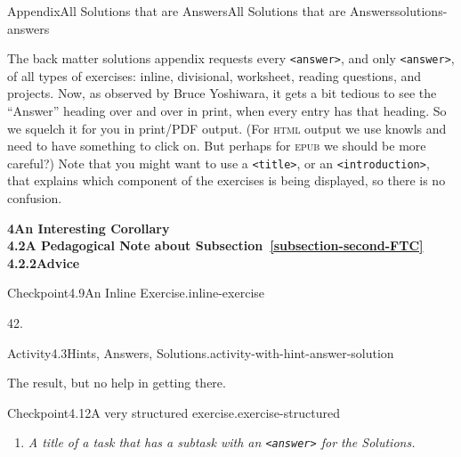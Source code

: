 \documentclass[twoside,10pt,]{article}
\newcommand{\xreffont}{\relax}
\newcommand{\mono}[1]{\texttt{#1}}
\newcommand{\initialism}[1]{\textsc{\MakeLowercase{#1}}}
\newcommand{\lititle}[1]{{\slshape#1}}
\numberwithin{equation}{section}
\begin{document}
\begin{solutions-section}{Appendix}{All Solutions that are Answers}{}{All Solutions that are Answers}{}{}{solutions-answers}
%
\begin{introduction}{}%
The back matter solutions appendix requests every \mono{<answer>}, and only \mono{<answer>}, of all types of exercises: inline, divisional, worksheet, reading questions, and projects.  Now, as observed by Bruce Yoshiwara, it gets a bit tedious to see the ``Answer'' heading over and over in print, when every entry has that heading.  So we squelch it for you in print\slash{}PDF output.  (For \initialism{HTML} output we use knowls and need to have something to click on.  But perhaps for \initialism{EPUB} we should be more careful?)  Note that you might want to use a \mono{<title>}, or an \mono{<introduction>}, that explains which component of the exercises is being displayed, so there is no confusion.%
\end{introduction}%
\par\medskip
\noindent\textbf{\large{}4\space\textperiodcentered\space{}An Interesting Corollary\\
4.2\space\textperiodcentered\space{}A Pedagogical Note about Subsection~{\xreffont\ref*{subsection-second-FTC}}\\
4.2.2\space\textperiodcentered\space{}Advice}
\begin{inlinesolution}{Checkpoint}{4.9}{An Inline Exercise.}{inline-exercise}%
\par\smallskip%
\noindent\hypertarget{inline-exercise-4-back}{}42.%
\end{inlinesolution}%
\begin{activitysolution}{Activity}{4.3}{Hints, Answers, Solutions.}{activity-with-hint-answer-solution}%
\par\smallskip%
\noindent\hypertarget{activity-with-hint-answer-solution-5-back}{}The result, but no help in getting there.%
\end{activitysolution}%
\begin{inlinesolution}{Checkpoint}{4.12}{A very structured exercise.}{exercise-structured}%
\begin{enumerate}[font=\bfseries,label=(\alph*),ref=\alph*]%
\item[(c)]\lititle{A title of a task that has a subtask with an \mono{<answer>} for the Solutions.}\par%
\begin{enumerate}[font=\bfseries,label=(\roman*),ref=\theenumi.\roman*]%

\end{enumerate}
\end{enumerate}
\end{inlinesolution}
\end{solutions-section}
\end{document}
